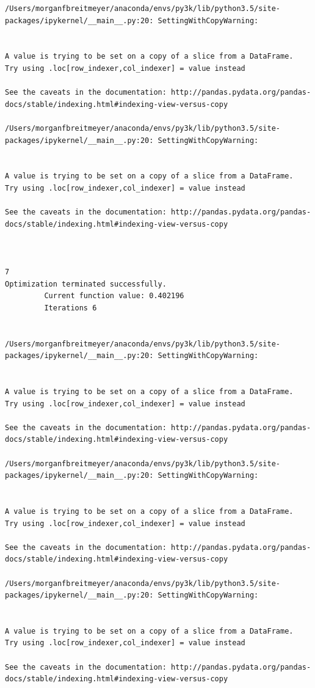\begin{lstlisting}
/Users/morganfbreitmeyer/anaconda/envs/py3k/lib/python3.5/site-packages/ipykernel/__main__.py:20: SettingWithCopyWarning:


A value is trying to be set on a copy of a slice from a DataFrame.
Try using .loc[row_indexer,col_indexer] = value instead

See the caveats in the documentation: http://pandas.pydata.org/pandas-docs/stable/indexing.html#indexing-view-versus-copy

/Users/morganfbreitmeyer/anaconda/envs/py3k/lib/python3.5/site-packages/ipykernel/__main__.py:20: SettingWithCopyWarning:


A value is trying to be set on a copy of a slice from a DataFrame.
Try using .loc[row_indexer,col_indexer] = value instead

See the caveats in the documentation: http://pandas.pydata.org/pandas-docs/stable/indexing.html#indexing-view-versus-copy



7
Optimization terminated successfully.
         Current function value: 0.402196
         Iterations 6


/Users/morganfbreitmeyer/anaconda/envs/py3k/lib/python3.5/site-packages/ipykernel/__main__.py:20: SettingWithCopyWarning:


A value is trying to be set on a copy of a slice from a DataFrame.
Try using .loc[row_indexer,col_indexer] = value instead

See the caveats in the documentation: http://pandas.pydata.org/pandas-docs/stable/indexing.html#indexing-view-versus-copy

/Users/morganfbreitmeyer/anaconda/envs/py3k/lib/python3.5/site-packages/ipykernel/__main__.py:20: SettingWithCopyWarning:


A value is trying to be set on a copy of a slice from a DataFrame.
Try using .loc[row_indexer,col_indexer] = value instead

See the caveats in the documentation: http://pandas.pydata.org/pandas-docs/stable/indexing.html#indexing-view-versus-copy

/Users/morganfbreitmeyer/anaconda/envs/py3k/lib/python3.5/site-packages/ipykernel/__main__.py:20: SettingWithCopyWarning:


A value is trying to be set on a copy of a slice from a DataFrame.
Try using .loc[row_indexer,col_indexer] = value instead

See the caveats in the documentation: http://pandas.pydata.org/pandas-docs/stable/indexing.html#indexing-view-versus-copy


\end{lstlisting}
